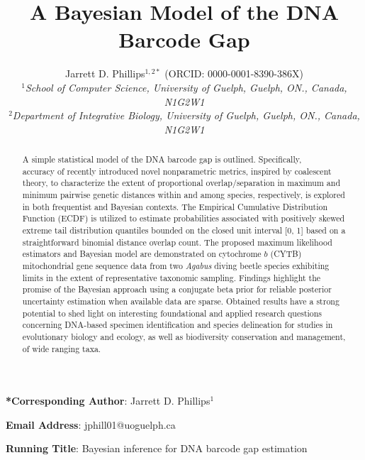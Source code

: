 \documentclass[12pt]{article}
\makeatletter
\renewcommand{\maketitle}{\bgroup\setlength{\parindent}{0pt}
\begin{flushleft}
\textbf{\@title}

  \@author
\end{flushleft}\egroup
}
\makeatother
\begin{document}
\linenumbers

\title{A Bayesian Model of the DNA Barcode Gap}

\author{Jarrett D. Phillips$^{1, 2*}$ (ORCID: 0000-0001-8390-386X)  \\
\textit{$^1$School of Computer Science, University of Guelph, Guelph, ON., Canada, N1G2W1} \\ \textit{$^2$Department of Integrative Biology, University of Guelph, Guelph, ON., Canada, N1G2W1} }

\date{}

\maketitle

\vspace{2mm}

\noindent \textbf{*Corresponding Author}: Jarrett D. Phillips$^{1}$

\noindent \textbf{Email Address}: jphill01@uoguelph.ca

\noindent \textbf{Running Title}: Bayesian inference for DNA barcode gap estimation

\newpage

\begin{abstract}

A simple statistical model of the DNA barcode gap is outlined. Specifically, \\ accuracy of recently introduced novel nonparametric metrics, inspired by coalescent theory, to characterize the extent of proportional overlap/separation in maximum and minimum pairwise genetic distances within and among species, respectively, is explored in both frequentist and Bayesian contexts. The Empirical Cumulative Distribution Function (ECDF) is utilized to estimate probabilities associated with positively skewed extreme tail distribution quantiles bounded on the closed unit interval [0, 1] based on a straightforward binomial distance overlap count. The proposed maximum likelihood estimators and Bayesian model are demonstrated on cytochrome $b$ (CYTB) \\ mitochondrial gene sequence data from two \textit{Agabus} diving beetle species exhibiting limits in the extent of representative taxonomic sampling. Findings highlight the promise of the Bayesian approach using a conjugate beta prior for reliable posterior uncertainty estimation when available data are sparse. Obtained results have a strong potential to shed light on  interesting foundational and applied research questions \\ concerning DNA-based specimen identification and species delineation for studies in evolutionary biology and ecology, as well as biodiversity conservation and management, of wide ranging taxa.

\end{abstract}
\end{document}
